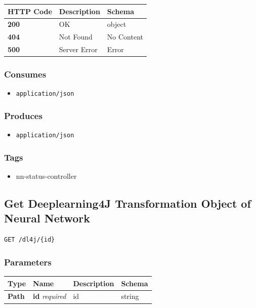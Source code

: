 \begin{longtable}[]{@{}lll@{}}
\toprule
HTTP Code & Description & Schema\tabularnewline
\midrule
\endhead
\textbf{200} & OK & object\tabularnewline
\textbf{404} & Not Found & No Content\tabularnewline
\textbf{500} & Server Error & Error\tabularnewline
\bottomrule
\end{longtable}

\subsubsection{Consumes}\label{consumes-6}

\begin{itemize}
\tightlist
\item
  \texttt{application/json}
\end{itemize}

\subsubsection{Produces}\label{produces-12}

\begin{itemize}
\tightlist
\item
  \texttt{application/json}
\end{itemize}

\subsubsection{Tags}\label{tags-12}

\begin{itemize}
\tightlist
\item
  nn-status-controller
\end{itemize}

\subsection{Get Deeplearning4J Transformation Object of Neural
Network}\label{get-deeplearning4j-transformation-object-of-neural-network}

\begin{verbatim}
GET /dl4j/{id}
\end{verbatim}

\subsubsection{Parameters}\label{parameters-10}

\begin{longtable}[]{@{}llll@{}}
\toprule
Type & Name & Description & Schema\tabularnewline
\midrule
\endhead
\textbf{Path} & \textbf{id} \emph{required} & id & string\tabularnewline
\bottomrule
\end{longtable}

